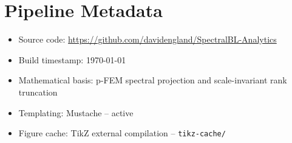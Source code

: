 \documentclass[11pt,a4paper]{article}
\begin{document}
\newpage



\newpage



\newpage



\newpage

\appendix

\section{Pipeline Metadata}

\begin{itemize}
    \item Source code: \url{https://github.com/davidengland/SpectralBL-Analytics}
    \item Build timestamp: \today{}
    \item Mathematical basis: p-FEM spectral projection and scale-invariant rank truncation
    \item Templating: Mustache -- active
    \item Figure cache: TikZ external compilation -- \texttt{tikz-cache/}
\end{itemize}
\end{document}
